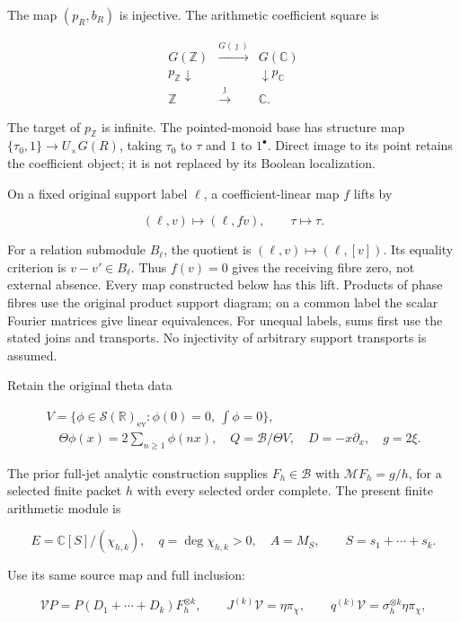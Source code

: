 The map \((p_R,b_R)\) is injective. The arithmetic coefficient square is

\[
\begin{array}{ccc}
G(\mathbb Z)&\xrightarrow{G(\jmath)}&G(\mathbb C)\\
p_{\mathbb Z}\downarrow&&\downarrow p_{\mathbb C}\\
\mathbb Z&\xrightarrow{\jmath}&\mathbb C.
\end{array}
\tag{H3}
\]

The target of \(p_{\mathbb Z}\) is infinite. The pointed-monoid base has
structure map \(\{\tau_0,1\}\to U_\times G(R)\), taking \(\tau_0\) to
\(\tau\) and \(1\) to \(1^\bullet\). Direct image to its point retains
the coefficient object; it is not replaced by its Boolean localization.

On a fixed original support label \(\ell\), a coefficient-linear map
\(f\) lifts by

\[
 (\ell,v)\longmapsto(\ell,fv),\qquad \tau\longmapsto\tau.
 \tag{H4}
\]

For a relation submodule \(B_\ell\), the quotient is
\((\ell,v)\mapsto(\ell,[v])\). Its equality criterion is
\(v-v'\in B_\ell\). Thus \(f(v)=0\) gives the receiving fibre zero, not
external absence. Every map constructed below has this lift. Products of
phase fibres use the original product support diagram; on a common label
the scalar Fourier matrices give linear equivalences. For unequal
labels, sums first use the stated joins and transports. No injectivity
of arbitrary support transports is assumed.

Retain the original theta data

\[
\begin{gathered}
 V=\{\phi\in\mathcal S(\mathbb R)_{\mathrm{ev}}:\phi(0)=0,\ \int\phi=0\},\\
 \quad\Theta\phi(x)=2\sum_{n\geq1}\phi(nx),\quad
 Q=\mathscr B/\Theta V,\quad D=-x\partial_x,\quad g=2\xi.
\end{gathered}
 \tag{H5}
\]

The prior full-jet analytic construction supplies \(F_h\in\mathscr B\)
with \(\mathcal MF_h=g/h\), for a selected finite packet \(h\) with
every selected order complete. The present finite arithmetic module is

\[
 E=\mathbb C[S]/(\chi_{h,k}),\quad q=\deg\chi_{h,k}>0,\quad A=M_S,
 \qquad S=s_1+\cdots+s_k.
 \tag{H6}
\]

Use its same source map and full inclusion:

\[
 \mathcal V P=P(D_1+\cdots+D_k)F_h^{\otimes k},\qquad
 J^{(k)}\mathcal V=\eta\pi_\chi,
 \qquad q^{(k)}\mathcal V=\sigma_h^{\otimes k}\eta\pi_\chi,
 \tag{H7}
\]

